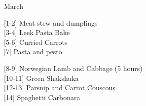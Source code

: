		\begin{menu}{March}
    
    \begin{recipelist}
    
        {\scriptsize[1-2]} Meat stew and dumplings\\
        {\scriptsize[3-4]} Leek Pasta Bake\\
        {\scriptsize[5-6]} Curried Carrots\\
        {\scriptsize[7]} Pasta and pesto\\%
    \end{recipelist}%
    \begin{recipelist}
    
        {\scriptsize[8-9]} Norwegian Lamb and Cabbage (5 hours)\\
        {\scriptsize[10-11]} Green Shakshuka\\
        {\scriptsize[12-13]} Parsnip and Carrot Couscous\\
        {\scriptsize[14]} Spaghetti Carbonara\\%
    \end{recipelist}\par%
  

\end{menu}
